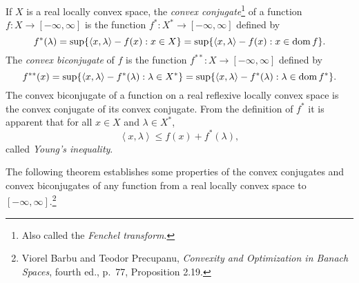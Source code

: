 \documentclass{article}
\newcommand{\inner}[2]{\left\langle #1, #2 \right\rangle}
\newcommand{\dom}{\ensuremath\mathrm{dom}\,}
\theoremstyle{definition}
\begin{document}
 

If $X$ is a real locally convex space, the {\em convex conjugate}\footnote{Also called the {\em Fenchel transform}.} of a function $f:X \to [-\infty,\infty]$ is the function
$f^*:X^* \to [-\infty,\infty]$ defined by
\[
f^*(\lambda)=\sup \{ \inner{x}{\lambda} - f(x): x \in X\}=\sup \{\inner{x}{\lambda}-f(x): x \in \dom f\}.
\]
The {\em convex biconjugate} of $f$ is the function $f^{**}:X \to [-\infty,\infty]$ defined by
\[
f^{**}(x) = \sup\{ \inner{x}{\lambda}-f^*(\lambda): \lambda \in X^*\}=\sup\{\inner{x}{\lambda}-f^*(\lambda): \lambda \in \dom f^*\}.
\]
The convex biconjugate of a function on  a real reflexive locally convex space is the convex conjugate of its convex conjugate.
From the definition of $f^*$ it is apparent that for all $x \in X$ and $\lambda \in X^*$,
\begin{equation}
\inner{x}{\lambda} \leq f(x)+f^*(\lambda),
\label{young}
\end{equation}
called {\em Young's inequality}. 


The following theorem establishes some properties of the convex conjugates and convex biconjugates of
any function from a real locally convex space to $[-\infty,\infty]$.\footnote{Viorel Barbu and Teodor Precupanu, {\em Convexity and Optimization in Banach Spaces}, fourth ed., p.~77, Proposition 2.19.}
\end{document}
